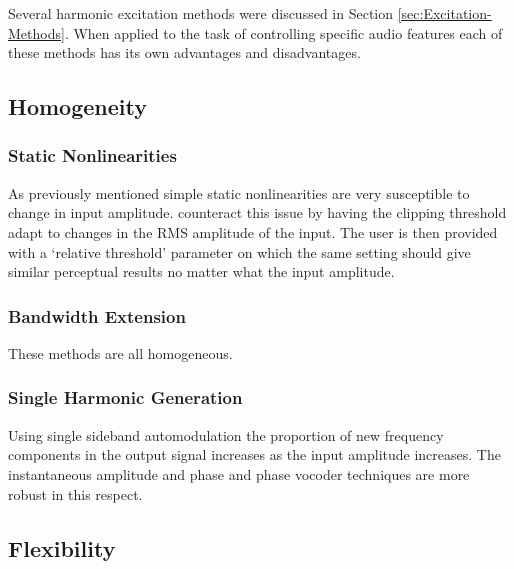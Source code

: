 
	Several harmonic excitation methods were discussed in Section \ref{sec:Excitation-Methods}. When applied to the task of controlling specific audio features each of these methods has its own advantages and disadvantages.

	\subsection{Homogeneity}
	\label{sec:FeatureControl-Homogeneity}

		\subsubsection*{Static Nonlinearities}		
			As previously mentioned simple static nonlinearities are very susceptible to change in input amplitude. \citet{deman2014adaptive} counteract this issue by having the clipping threshold adapt to changes in the RMS amplitude of the input. The user is then provided with a `relative threshold' parameter on which the same setting should give similar perceptual results no matter what the input amplitude.


		\subsubsection*{Bandwidth Extension}
			These methods are all homogeneous.
			
		\subsubsection*{Single Harmonic Generation}
			Using single sideband automodulation the proportion of new frequency components in the output signal increases as the input amplitude increases. The instantaneous amplitude and phase and phase vocoder techniques are more robust in this respect.

	\subsection{Flexibility}
	\label{sec:FeatureControl-Flexibility}


